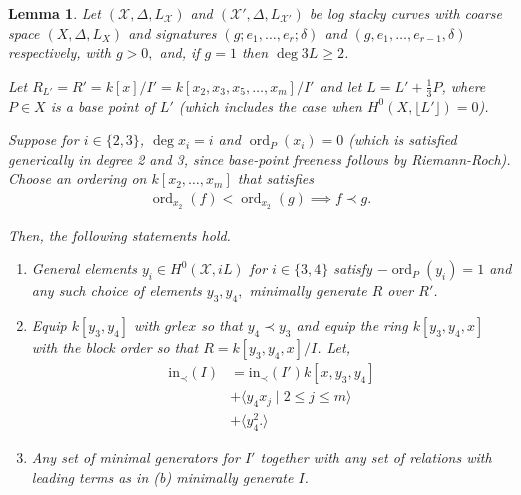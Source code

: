 \documentclass{amsart}
\theoremstyle{plain}
\newtheorem{lem}[thm]{Lemma}
\theoremstyle{definition}
\theoremstyle{remark}
\numberwithin{equation}{section}
\newcommand \sx{\mathscr X}
\DeclareMathOperator{\ord}{ord}
\newcommand \halfcan{L}
\newcommand \initial{\text{in}}
\begin{document}
\begin{lem}
\label{lem:sat-two-induction-high-genus}
Let $(\sx, \Delta, \halfcan_\sx)$ and $(\sx', \Delta, \halfcan_{\sx'})$ be log stacky curves with coarse space $(X, \Delta, L_X)$ and signatures $(g; e_1, \ldots, e_r; \delta)$ and $(g, e_1, \ldots, e_{r-1}, \delta)$ respectively, with $g > 0,$ and, if $g = 1$ then $\deg 3L \geq 2$.

Let $R_{L'} = R' = k[x]/I'= k[x_2, x_3
, x_5,\ldots, x_m]/I'$ and let $\halfcan = \halfcan' + \frac{1}{
3}P$, where $P\in X$ is a base point of $\halfcan'$ (which includes the case when $H^0(X, \lfloor \halfcan'\rfloor) = 0$).

Suppose for $i \in \{2, 3\}$, $\deg x_i = i$ and $\ord_P(x_i)=0$ (which is satisfied generically in degree 2 and 3, since base-point freeness follows by Riemann-Roch).  Choose an ordering on $k[x_2, \ldots, x_m]$ that satisfies
\begin{align*}
	\ord_{x_2}(f) < \ord_{x_2}(g) \implies f \prec g.
\end{align*}

\noindent
Then, the following statements hold.

\begin{enumerate}
	\item[(a)] General elements  $y_i \in H^0(\sx,iL)$ for $i \in
		\{3, 4\}$ satisfy $-\ord_P(y_i) = 1$ and any such choice of elements
		$y_3,y_4,$ minimally generate $R$ over $R'$.
	\item[(b)] Equip $k[y_3, y_4]$ with $grlex$ so that $y_4 \prec 
		y_3$
		and equip the ring $k[y_3, y_4, x]$ with the block 
		order so that $R = k[y_3, y_4, x]/I$. Let,
		\begin{align*}
			\initial_\prec(I) &= \initial_\prec(I')k[x, y_3, y_4] \\
			&+\langle y_4 x_j \mid 2 \leq j \leq m \rangle \\
			&+\langle y_4^2.\rangle
		\end{align*}
	\item[(c)] Any set of minimal generators for $I'$ together with 
		any set of relations with leading terms as in (b) minimally 
		generate $I$.
\end{enumerate}
\end{lem}
\end{document}
